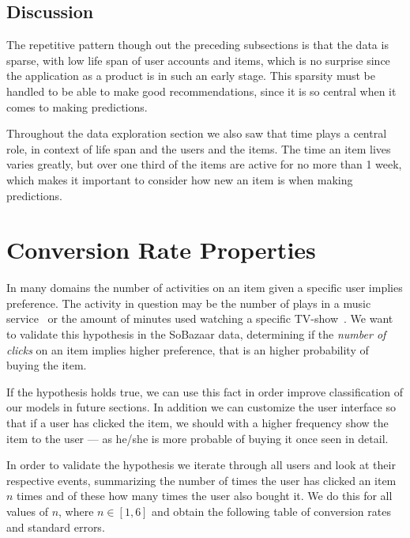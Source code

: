 \subsection{Discussion}
    The repetitive pattern though out the preceding subsections is that the data is sparse, with low life span of user accounts and items, which is no surprise since the application as a product is in such an early stage.
    This sparsity must be handled to be able to make good recommendations, since it is so central when it comes to making predictions.

    Throughout the data exploration section we also saw that time plays a central role, in context of life span and the users and the items.
    The time an item lives varies greatly, but over one third of the items are active for no more than 1 week, which makes it important to consider how new an item is when making predictions.


\section{Conversion Rate Properties}
\label{sec:conv-rate}

In many domains the number of activities on an item given a specific user
implies preference. The activity in question may be the number of plays in a
music service~\cite{parra2011walk} or the amount of minutes used watching a
specific TV-show~\cite{study-on-implicit-tv}. We want to validate this
hypothesis in the SoBazaar data, determining if the \textit{number of clicks}
on an item implies higher preference, that is an higher probability of buying
the item.

If the hypothesis holds true, we can use this fact in order improve
classification of our models in future sections. In addition we can customize
the user interface so that if a user has clicked the item, we should with a
higher frequency show the item to the user --- as he/she is more probable of
buying it once seen in detail.

In order to validate the hypothesis we iterate through all users and look at
their respective events, summarizing the number of times the user has clicked
an item $n$ times and of these how many times the user also bought it. We do
this for all values of $n$, where $n \in [1,6]$ and obtain the following table
of conversion rates and standard errors.

